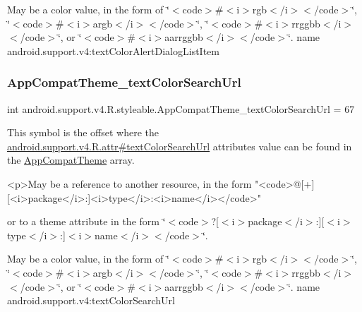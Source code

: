 May be a color value, in the form of \char`\"{}$<$code$>$\#$<$i$>$rgb$<$/i$>$$<$/code$>$\char`\"{}, \char`\"{}$<$code$>$\#$<$i$>$argb$<$/i$>$$<$/code$>$\char`\"{}, \char`\"{}$<$code$>$\#$<$i$>$rrggbb$<$/i$>$$<$/code$>$\char`\"{}, or \char`\"{}$<$code$>$\#$<$i$>$aarrggbb$<$/i$>$$<$/code$>$\char`\"{}.  name android.\+support.\+v4\+:text\+Color\+Alert\+Dialog\+List\+Item \mbox{\label{classandroid_1_1support_1_1v4_1_1R_1_1styleable_af247dbb00ad2d383e2bbe1ed27fd7304}} 
\subsubsection{\texorpdfstring{App\+Compat\+Theme\+\_\+text\+Color\+Search\+Url}{AppCompatTheme\_textColorSearchUrl}}
{\footnotesize\ttfamily int android.\+support.\+v4.\+R.\+styleable.\+App\+Compat\+Theme\+\_\+text\+Color\+Search\+Url = 67\hspace{0.3cm}{\ttfamily [static]}}

This symbol is the offset where the \hyperlink{classandroid_1_1support_1_1v4_1_1R_1_1attr_a3dce28340c463d79b7547b6bac8e41cd}{android.\+support.\+v4.\+R.\+attr\#text\+Color\+Search\+Url} attribute\textquotesingle{}s value can be found in the \hyperlink{classandroid_1_1support_1_1v4_1_1R_1_1styleable_ac07ebbe62ed977f6dcaadc6397840ace}{App\+Compat\+Theme} array.

\begin{DoxyVerb}      <p>May be a reference to another resource, in the form "<code>@[+][<i>package</i>:]<i>type</i>:<i>name</i></code>"
\end{DoxyVerb}
 or to a theme attribute in the form \char`\"{}$<$code$>$?\mbox{[}$<$i$>$package$<$/i$>$\+:\mbox{]}\mbox{[}$<$i$>$type$<$/i$>$\+:\mbox{]}$<$i$>$name$<$/i$>$$<$/code$>$\char`\"{}. 

May be a color value, in the form of \char`\"{}$<$code$>$\#$<$i$>$rgb$<$/i$>$$<$/code$>$\char`\"{}, \char`\"{}$<$code$>$\#$<$i$>$argb$<$/i$>$$<$/code$>$\char`\"{}, \char`\"{}$<$code$>$\#$<$i$>$rrggbb$<$/i$>$$<$/code$>$\char`\"{}, or \char`\"{}$<$code$>$\#$<$i$>$aarrggbb$<$/i$>$$<$/code$>$\char`\"{}.  name android.\+support.\+v4\+:text\+Color\+Search\+Url \mbox{\label{classandroid_1_1support_1_1v4_1_1R_1_1styleable_aa8e0c46e553d29574374131334849630}} 
